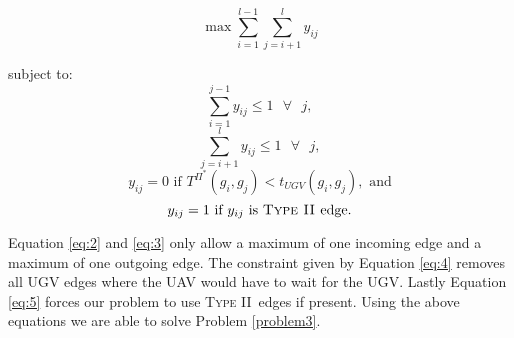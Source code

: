 \documentclass[letterpaper,10pt,conference]{ieeeconf}
\newcommand{\typetwo}{\textsc{Type II\ }}
\begin{document}
\begin{equation}
\max{\sum_{i = 1}^{l-1}\sum_{j = i+1}^{l}y_{ij}}
\end{equation}

subject to:
\begin{equation}
\sum_{i=1}^{j-1}y_{ij}\le1 \text{  } \forall \text{  } j, \label{eq:2}
\end{equation}
\begin{equation}
\sum_{j=i+1}^{l}y_{ij}\le1 \text{  } \forall \text{  } j, \label{eq:3}
\end{equation}
\begin{equation}
y_{ij} = 0 \text{  if  } T^{\Pi^*}(g_i,g_j) < t_{UGV}(g_i,g_j), \text{  and}
\label{eq:4}
\end{equation}
\begin{equation}\label{eq:5}
y_{ij} = 1 \text{  if  } y_{ij} \text{  is \typetwo edge.}
\end{equation}

Equation \ref{eq:2} and \ref{eq:3} only allow a maximum of one incoming edge and a maximum of one outgoing edge. The constraint given by Equation \ref{eq:4} removes all UGV edges where the UAV would have to wait for the UGV. Lastly Equation \ref{eq:5} forces our problem to use \typetwo edges if present. Using the above equations we are able to solve Problem \ref{problem3}.



\end{document}
